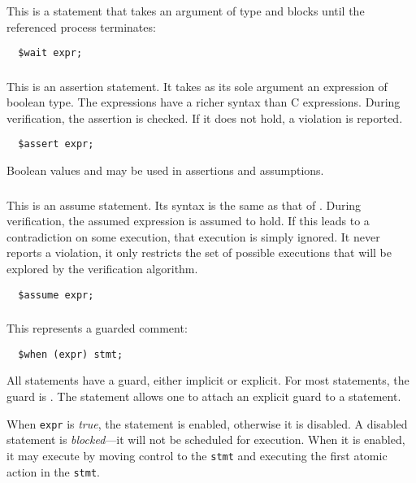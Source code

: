 \documentclass[11pt]{article}
\begin{document}
\subsubsection{\cwait} This is a statement that takes an argument of
type \cproc{} and blocks until the referenced process terminates:
\begin{verbatim}
  $wait expr;
\end{verbatim}

\subsubsection{\cassert} This is an assertion statement.  It takes as
its sole argument an expression of boolean type.  The expressions have
a richer syntax than C expressions.  During verification, the
assertion is checked.  If it does not hold, a violation is reported.
\begin{verbatim}
  $assert expr;
\end{verbatim}
Boolean values \ctrue{} and \cfalse{} may be used in assertions
and assumptions.

\subsubsection{\cassume} This is an assume statement. Its syntax is
the same as that of \cassert.  During verification, the assumed
expression is assumed to hold.  If this leads to a contradiction on
some execution, that execution is simply ignored.  It never reports a
violation, it only restricts the set of possible executions that will
be explored by the verification algorithm.
\begin{verbatim}
  $assume expr;
\end{verbatim}

\subsubsection{\cwhen} This represents a guarded comment:
\begin{verbatim}
  $when (expr) stmt;
\end{verbatim}
All statements have a guard, either implicit or explicit.  For most
statements, the guard is \ctrue.  The \cwhen{} statement allows one to
attach an explicit guard to a statement.

When \texttt{expr} is \emph{true}, the statement is enabled, otherwise
it is disabled.  A disabled statement is \emph{blocked}---it will not
be scheduled for execution.  When it is enabled, it may execute by
moving control to the \texttt{stmt} and executing the first atomic
action in the \texttt{stmt}.
\end{document}
